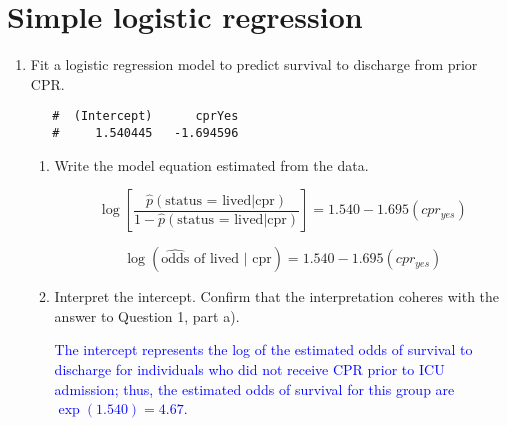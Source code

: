 \documentclass[letterpaper,12pt,twoside,]{pinp}
\begin{document}
\hypertarget{simple-logistic-regression}{%
\section{Simple logistic regression}\label{simple-logistic-regression}}

\begin{enumerate}
\def\labelenumi{\arabic{enumi}.}
\setcounter{enumi}{2}
\item
  Fit a logistic regression model to predict survival to discharge from
  prior CPR.

\begin{Shaded}
\begin{Highlighting}[]
\SpecialCharTok{\textasciitilde{}} \NormalTok{(} \NormalTok{))}\SpecialCharTok{$}
\end{Highlighting}
\end{Shaded}

  \begin{ShadedResult}
   \begin{verbatim}
   #  (Intercept)      cprYes 
   #     1.540445   -1.694596
   \end{verbatim}
   \end{ShadedResult}

  \begin{enumerate}
  \def\labelenumii{\alph{enumii})}
  \item
    Write the model equation estimated from the data.

    \color{blue}

    \[\log\left[\frac{\hat{p}( \text{status = lived} |\text{cpr})}{1 - \hat{p}(\text{status = lived} | \text{cpr})}\right] = 1.540 -1.695(cpr_{yes})\]

    \[\log (\widehat{\text{odds}}\text{ of lived | cpr}) = 1.540 -1.695(cpr_{yes}) \]

    \color{black}
  \item
    Interpret the intercept. Confirm that the interpretation coheres
    with the answer to Question 1, part a).

    \textcolor{blue}{The intercept represents the log of the estimated odds of survival to discharge for individuals who did not receive CPR prior to ICU admission; thus, the estimated odds of survival for this group are $\exp(1.540) = 4.67$. }
  \end{enumerate}


\end{enumerate}
\end{document}
